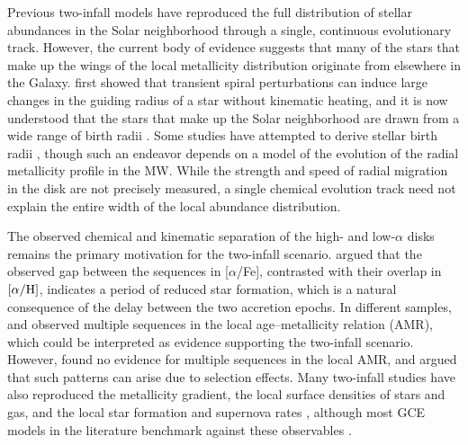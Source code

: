 \documentclass[twocolumn,twocolappendix,linenumbers]{aastex631}
\newcommand{\todo}[1]{{\color{red}#1}}
\newcommand{\aFe}{[$\alpha$/Fe]\xspace}
\begin{document}
Previous two-infall models have reproduced the full distribution of stellar abundances in the Solar neighborhood through a single, continuous evolutionary track. However, the current body of evidence suggests that many of the stars that make up the wings of the local metallicity distribution originate from elsewhere in the Galaxy. \citet{sellwood_radial_2002} first showed that transient spiral perturbations can induce large changes in the guiding radius of a star without kinematic heating, and it is now understood that the stars that make up the Solar neighborhood are drawn from a wide range of birth radii \citep[e.g.,][]{schonrich_chemical_2009,frankel_measuring_2018,lehmann_probing_2024}. Some studies have attempted to derive stellar birth radii \citep[e.g.,][]{ratcliffe_unveiling_2023,lu_there_2024}, though such an endeavor depends on a model of the evolution of the radial metallicity profile in the MW. While the strength and speed of radial migration in the disk are not precisely measured, a single chemical evolution track need not explain the entire width of the local abundance distribution.

The observed chemical and kinematic separation of the high- and low-$\alpha$ disks remains the primary motivation for the two-infall scenario. \citet{spitoni_remind_2024} argued that the observed gap between the sequences in \aFe, contrasted with their overlap in $[\alpha/{\rm H}]$, indicates a period of reduced star formation, which is a natural consequence of the delay between the two accretion epochs. In different samples, \citet{nissen_high-precision_2020} and \citet{nataf_accurate_2024} observed multiple sequences in the local age--metallicity relation (AMR), which could be interpreted as evidence supporting the two-infall scenario. However, \citet{plotnikova_chemical_2024} found no evidence for multiple sequences in the local AMR, and argued that such patterns can arise due to selection effects. Many two-infall studies have also reproduced the metallicity gradient, the local surface densities of stars and gas, and the local star formation and supernova rates \citep[e.g.,][]{chiappini_chemical_1997,romano_mass_2000,spitoni_remind_2024}, although most GCE models in the literature benchmark against these observables \citep[e.g.,][]{minchev_chemodynamical_2013,johnson_stellar_2021}.
\end{document}
